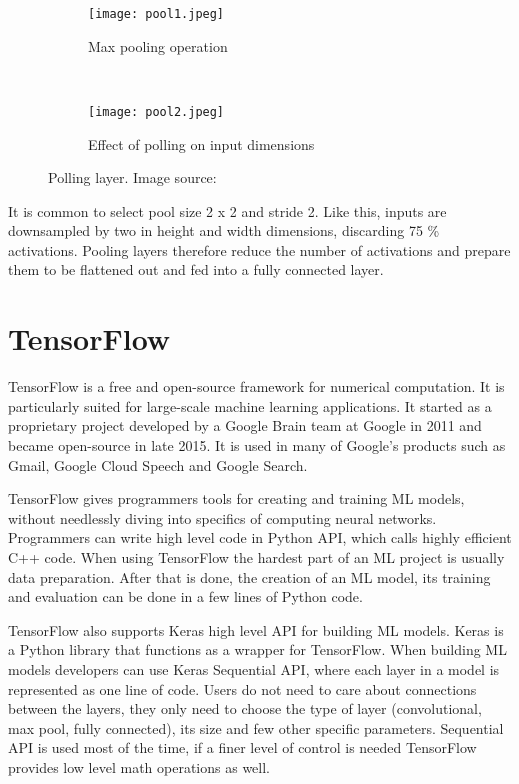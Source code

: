 \begin{figure}[ht] 
    \begin{subfigure}[b]{0.5\textwidth}
        \centering
        \texttt{[image: pool1.jpeg]} 
        \caption{Max pooling operation}
        \label{pool1}
    \end{subfigure}
    \unskip\ \vrule\ 
    \begin{subfigure}[b]{0.5\textwidth}
        \centering
        \texttt{[image: pool2.jpeg]} 
        \caption{ Effect of polling on input dimensions}
        \label{pool2}
    \end{subfigure}
    \caption{ Polling layer. Image source: \cite{cs231n}}
    \label{pool_layer}
\end{figure}

It is common to select pool size 2 x 2 and stride 2.
Like this, inputs are downsampled by two in height and width dimensions, discarding 75 \% activations.
Pooling layers therefore reduce the number of activations and prepare them to be flattened out and fed into a fully connected layer.

\section{ TensorFlow}

TensorFlow is a free and open-source framework for numerical computation.
It is particularly suited for large-scale machine learning applications\cite{geron}.
It started as a proprietary project developed by a Google Brain team at Google in 2011 and became open-source in late 2015.
It is used in many of Google's products such as Gmail, Google Cloud Speech and Google Search.

TensorFlow gives programmers tools for creating and training ML models, without needlessly diving into specifics of computing neural networks.
Programmers can write high level code in Python API, which calls highly efficient C++ code.
When using TensorFlow the hardest part of an ML project is usually data preparation.
After that is done, the creation of an ML model, its training and evaluation can be done in a few lines of Python code.

TensorFlow also supports Keras high level API for building ML models. 
Keras is a Python library that functions as a wrapper for TensorFlow.
When building ML models developers can use Keras Sequential API, where each layer in a model is represented as one line of code.
Users do not need to care about connections between the layers, they only need to choose the type of layer (convolutional, max pool, fully connected), its size and few other specific parameters.
Sequential API is used most of the time, if a finer level of control is needed TensorFlow provides low level math operations as well.

